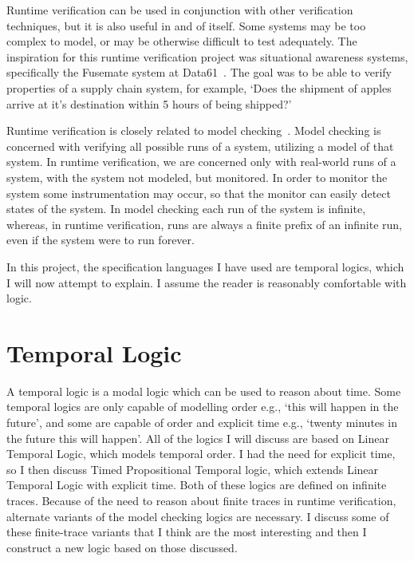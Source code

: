\documentclass[a4paper]{article}
\begin{document}
Runtime verification can be used in conjunction with other verification techniques, but it is also useful in and of itself. Some systems may be too complex to model, or may be otherwise difficult to test adequately. The inspiration for this runtime verification project was situational awareness systems, specifically the Fusemate system at Data61~\autocite{Baumgartner:Haslum:situational-awareness-industrial-operations:ASOR:2018}. The goal was to be able to verify properties of a supply chain system, for example, `Does the shipment of apples arrive at it's destination within 5 hours of being shipped?'

Runtime verification is closely related to model checking~\autocite{baier2008principles}. Model checking is concerned with verifying all possible runs of a system, utilizing a model of that system. In runtime verification, we are concerned only with real-world runs of a system, with the system not modeled, but monitored. In order to monitor the system some instrumentation may occur, so that the monitor can easily detect states of the system. In model checking each run of the system is infinite, whereas, in runtime verification, runs are always a finite prefix of an infinite run, even if the system were to run forever.

In this project, the specification languages I have used are temporal logics, which I will now attempt to explain. I assume the reader is reasonably comfortable with logic.

\section{Temporal Logic}

A temporal logic is a modal logic which can be used to reason about time. Some temporal logics are only capable of modelling order e.g., `this will happen in the future', and some are capable of order and explicit time e.g., `twenty minutes in the future this will happen'. All of the logics I will discuss are based on Linear Temporal Logic, which models temporal order. I had the need for explicit time, so I then discuss Timed Propositional Temporal logic, which extends Linear Temporal Logic with explicit time. Both of these logics are defined on infinite traces. Because of the need to reason about finite traces in runtime verification, alternate variants of the model checking logics are necessary. I discuss some of these finite-trace variants that I think are the most interesting and then I construct a new logic based on those discussed.
\end{document}
